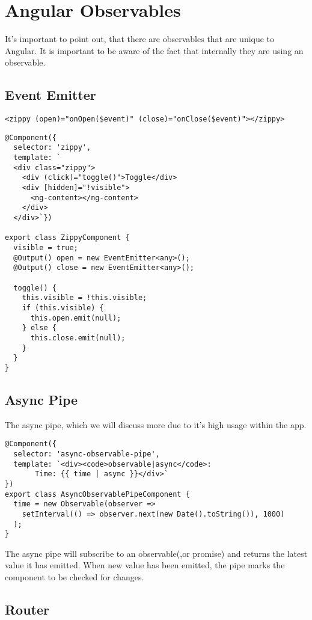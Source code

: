 
\chapter{ Angular Observables }
It's important to point out, that there are observables that are unique to 
Angular. It is important to be aware of the fact that internally they are 
using an observable. 

\section{ Event Emitter }

\begin{lstlisting}
<zippy (open)="onOpen($event)" (close)="onClose($event)"></zippy>
\end{lstlisting}

\begin{lstlisting}
@Component({
  selector: 'zippy',
  template: `
  <div class="zippy">
    <div (click)="toggle()">Toggle</div>
    <div [hidden]="!visible">
      <ng-content></ng-content>
    </div>
  </div>`})

export class ZippyComponent {
  visible = true;
  @Output() open = new EventEmitter<any>();
  @Output() close = new EventEmitter<any>();

  toggle() {
    this.visible = !this.visible;
    if (this.visible) {
      this.open.emit(null);
    } else {
      this.close.emit(null);
    }
  }
}
\end{lstlisting}

\section{ Async Pipe }
The async pipe, which we will discuss more due to it's high usage within the
app. 

\begin{lstlisting}
@Component({
  selector: 'async-observable-pipe',
  template: `<div><code>observable|async</code>:
       Time: {{ time | async }}</div>`
})
export class AsyncObservablePipeComponent {
  time = new Observable(observer =>
    setInterval(() => observer.next(new Date().toString()), 1000)
  );
}
\end{lstlisting}

The async pipe will subscribe to an observable(,or promise) and returns the 
latest value it has emitted. When new value has been emitted, the pipe marks 
the component to be checked for changes. 

\section{ Router }
